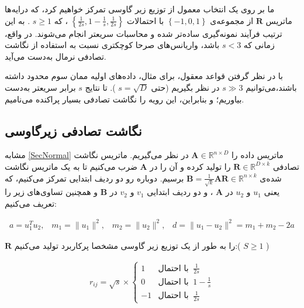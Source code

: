 ما بر روی یک انتخاب معمول از توزیع زیر گاوسی تمرکز خواهیم کرد، که درایه‌ها ماتریس 
$\mathbf{R}$
از مجموعه‌ی 
$\left\{ -1, 0, 1 \right\}$
با احتمالات 
$\left\{ \frac{1}{2s}, 1 - \frac{1}{s}, \frac{1}{2s} \right\}$
، که 
$s \geq 1$
. به این ترتیب فرآیند نمونه‌گیری ساده‌تر شده و محاسبات سریعتر انجام می‌شوند. در واقع، زمانی که 
$s < 3$
باشد، واریانس‌های صرحا کوچکتری نسبت به استفاده از نگاشت تصادفی نرمال به‌دست می‌آید.

با در نظر گرفتن قواعد معقول، برای مثال، داده‌های اولیه ممان سوم محدود داشته باشند،می‌توانیم 
$s \gg 3$
در نظر بگیریم (حتی 
$s = \sqrt{D}$
).
تا نتایج 
$s$
برابر سریعتر به‌دست بیاوریم؛ و بنابراین، این رویه را نگاشت تصادفی بسیار پراکنده می‌نامیم.


\subsection{
نگاشت تصادفی زیرگاوسی
}

مشابه
\autoref{SecNormal}
ماتریس داده را 
$\mathbf{A} \in \mathbb{R}^{n \times D}$
در نظر می‌گیریم. ماتریس نگاشت تصادفی 
$\mathbf{R} \in \mathbb{R}^{D \times k}$
را تولید کرده و آن را در 
$\mathbf{A}$
ضرب می‌کنیم تا به یک ماتریس نگاشت شده‌‌ی 
$\mathbf{B} = \frac{1}{\sqrt{k}} \mathbf{AR} \in \mathbb{R}^{n \times k}$
برسیم. دوباره رو دو ردیف ابتدایی تمرکز می‌کنیم، که یعنی 
$u_1$
و 
$u_2$
در 
$\mathbf{A}$
، و دو ردیف ابتدایی 
$v_1$
و 
$v_2$
در 
$\mathbf{B}$
و همچنین تساوی‌های زیر را تعریف می‌کنیم:

\begin{align}
a = u_1^T u_2, \;\;\; m_1 = \| u_1 \|^2, \;\;\; m_2 = \| u_2 \|^2, \;\;\;
d = \| u_1 - u_2 \|^2 = m_1 + m_2 - 2a
\label{eq:1iL}
\end{align}

$\mathbf{R}$
را به طور 
از یک توزیع زیر گاوسی مشخصا پرکاربرد تولید می‌کنیم:(
$S \geq 1$
)

\begin{align}
r_{ij} = \sqrt{s} \times 
\begin{cases}
1 & \text{با احتمال} \;\; \frac{1}{2s}\\
0 & \text{با احتمال} \;\; 
1-\frac{1}{s}\\
-1 & \text{با احتمال} \;\; \frac{1}{2s}
\end{cases} 
\label{eq:1iM}
\end{align}

